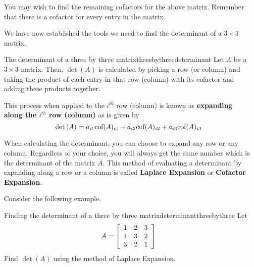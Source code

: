 You may wish to find the remaining cofactors for the above matrix. Remember that there is a cofactor 
for every entry in the matrix.  

We have now established the tools we need to find the determinant of a $3 \times3 $ matrix.

\begin{definition}{The determinant of a three by three matrix}{threebythreedeterminant}
Let $A$ be a $3\times 3$ matrix. Then, $\det \left(A\right)$ is calculated by picking a row
(or column) and taking the product of each entry in that row (column) with its
cofactor and adding these products together. 

This process when applied to the $i^{th}$
row (column) is known as \textbf{expanding along the $i^{th}$ row
(column)} as is given by 
\[
\det \left(A\right) = a_{i1}\mbox{cof}(A)_{i1} + a_{i2}\mbox{cof}(A)_{i2} + a_{i3}\mbox{cof}(A)_{i3}
\]

\end{definition}

When calculating the determinant, you can choose to expand any row or any column. Regardless 
of your choice, you will always get the same number which is the determinant of the matrix $A.$ 
This method of evaluating a determinant by expanding along a row or a column is called \textbf{Laplace
Expansion} or \textbf{Cofactor Expansion}.


Consider the following example. 

\begin{example}{Finding the determinant of a three by three matrix}{determinantthreebythree}
Let 
\begin{equation*}
A=\left[
\begin{array}{rrr}
1 & 2 & 3 \\
4 & 3 & 2 \\
3 & 2 & 1
\end{array}
\right] 
\end{equation*}
Find $\det\left(A\right)$ using the method of Laplace Expansion.
\end{example}

